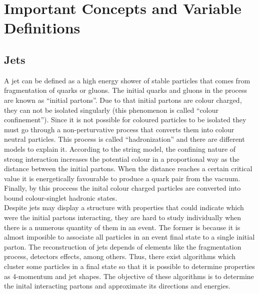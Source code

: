  \chapter{Important Concepts and Variable Definitions}\label{Important_concepts_chapter}
 
 \section{Jets}
 A jet can be defined as a high energy shower of stable particles that comes from fragmentation of quarks or gluons. The initial quarks and gluons in the process are known as ``initial partons''.
 Due to that initial partons are colour charged, they can not be isolated singularly (this phenomenon is called ``colour confinement''). Since it is not possible for coloured particles to be isolated 
 they must go through a non-perturvative process that converts them into colour neutral particles. This process is called ``hadronization'' and there are different models to explain it. According to 
 the string model, the confining nature of strong interaction increases the potential colour in a proportional way as the distance between the initial partons. When the distance reaches a certain 
 critical value it is energetically favourable to produce a quark pair from the vacuum. Finally, by this proccess the inital colour charged particles are converted into bound colour-singlet hadronic 
 states. \\
 
 Despite jets may display a structure with properties that could indicate which were the initial partons interacting, they are hard to study individually when there is a numerous quantity of them
 in an event. The former is because it is almost imposible to associate all particles in an event final state to a single initial parton. The reconstruction of jets depends of elements like the 
 fragmentation process, detectors effects, among others. Thus, there exist algorithms which cluster some particles in a final state so that it is possible to determine properties as 4-momentum 
 and jet shapes. The objective of these algorithms is to determine the inital interacting partons and approximate its directions and energies. \\
 
